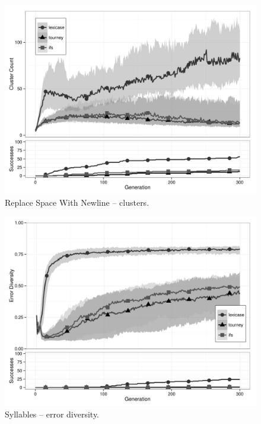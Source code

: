 \begin{figure}[p] %
\centering
\includegraphics[width=11.5cm]{replace-space-with-newline-cluster.pdf}
\caption{Replace Space With Newline -- clusters.}
\label{rswnClu}
\end{figure}

\begin{figure}[p] %
\centering
\includegraphics[width=11.5cm]{syllables-diversity.pdf}
\caption{Syllables -- error diversity.}
\label{syllablesDiv}
\end{figure}

